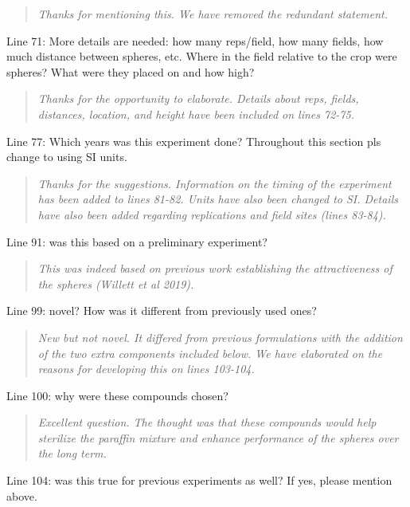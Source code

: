 \documentclass{article}
\begin{document}
\begin{quote}
    \textit{Thanks for mentioning this.  We have removed the redundant statement.  }
\end{quote}

Line 71: More details are needed: how many reps/field, how many fields, how much distance between spheres, etc. Where in the field relative to the crop were spheres? What were they placed on and how high?

\begin{quote}
    \textit{Thanks for the opportunity to elaborate.  Details about reps, fields, distances, location, and height have been included on lines 72-75.
    }
\end{quote}

Line 77: Which years was this experiment done? Throughout this section pls change to using SI units.

\begin{quote}
    \textit{Thanks for the suggestions.  Information on the timing of the experiment has been added to lines 81-82. Units have also been changed to SI.  Details have also been added regarding replications and field sites (lines 83-84).
    }
\end{quote}

Line 91: was this based on a preliminary experiment?

\begin{quote}
    \textit{This was indeed based on previous work establishing the attractiveness of the spheres (Willett et al 2019). }
\end{quote}

Line 99: novel? How was it different from previously used ones?

\begin{quote}
    \textit{New but not novel.  It differed from previous formulations with the addition of the two extra components included below.  We have elaborated on the reasons for developing this on lines 103-104.   
    }
\end{quote}

Line 100: why were these compounds chosen?

\begin{quote}
    \textit{Excellent question.  The thought was that these compounds would help sterilize the paraffin mixture and enhance performance of the spheres over the long term.  }
\end{quote}

Line 104: was this true for previous experiments as well? If yes, please mention above.
\end{document}
